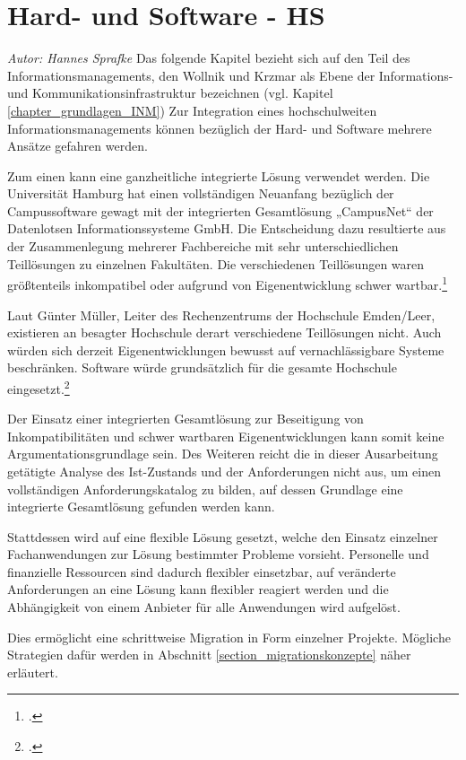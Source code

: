 \section{Hard- und Software - HS}
\textit{Autor: Hannes Sprafke}
Das folgende Kapitel bezieht sich auf den Teil des Informationsmanagements, den 
Wollnik und Krzmar als Ebene der Informations- und Kommunikationsinfrastruktur 
bezeichnen (vgl. Kapitel \ref{chapter_grundlagen_INM}) Zur Integration eines hochschulweiten 
Informationsmanagements können bezüglich der Hard- und Software mehrere Ansätze 
gefahren werden.

Zum einen kann eine ganzheitliche integrierte Lösung verwendet werden. Die Universität 
Hamburg hat einen vollständigen Neuanfang bezüglich der Campussoftware gewagt mit 
der integrierten Gesamtlösung „CampusNet“ der Datenlotsen Informationssysteme GmbH. 
Die Entscheidung dazu resultierte aus der Zusammenlegung mehrerer Fachbereiche mit 
sehr unterschiedlichen Teillösungen zu einzelnen Fakultäten. Die verschiedenen Teillösungen 
waren größtenteils inkompatibel oder aufgrund von Eigenentwicklung schwer 
wartbar.\footcite[Vgl.][38]{dini_webportale_2007}

Laut Günter Müller, Leiter des Rechenzentrums der Hochschule Emden/Leer, existieren 
an besagter Hochschule derart verschiedene Teillösungen nicht. Auch würden sich derzeit
Eigenentwicklungen bewusst auf vernachlässigbare Systeme beschränken. 
Software würde grundsätzlich für die gesamte Hochschule 
eingesetzt.\footcite{gunter_muller_interview}

Der Einsatz einer integrierten Gesamtlösung zur Beseitigung von Inkompatibilitäten und 
schwer wartbaren Eigenentwicklungen kann somit keine Argumentationsgrundlage sein.
Des Weiteren reicht die in dieser Ausarbeitung getätigte Analyse des Ist-Zustands und 
der Anforderungen nicht aus, um einen vollständigen Anforderungskatalog zu bilden, 
auf dessen Grundlage eine integrierte Gesamtlösung gefunden werden kann.

Stattdessen wird auf eine flexible Lösung gesetzt, welche den Einsatz einzelner 
Fachanwendungen zur Lösung bestimmter Probleme vorsieht. Personelle und 
finanzielle Ressourcen sind dadurch flexibler einsetzbar, auf veränderte Anforderungen 
an eine Lösung kann flexibler reagiert werden und die Abhängigkeit von einem 
Anbieter für alle Anwendungen wird aufgelöst.

Dies ermöglicht eine schrittweise Migration in Form einzelner Projekte. 
Mögliche Strategien dafür werden in Abschnitt \ref{section_migrationskonzepte} näher erläutert. 

